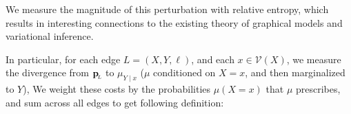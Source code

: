 \documentclass{article}
\newcommand{\bp}[1][L]{\mat{p}_{\!_{#1}\!}}
\newcommand{\V}{\mathcal V}
\numberwithin{equation}{section}
\begin{document}
%
	We measure the magnitude of this perturbation with relative
        entropy, which results in interesting connections to 
		the existing theory of graphical models and variational inference.
		
		In particular, for each edge $L =
		       (X,Y, \ell)$, and each $x \in \V(X)$, we measure the
		divergence from $\bp$ to $\mu_{Y \mid x}$ ($\mu$ conditioned
		on $X=x$, and then marginalized to $Y$), 
	We weight these costs by the probabilities $\mu(X=x)$ that $\mu$ prescribes, and sum across all edges to get following definition:
        
\end{document}
